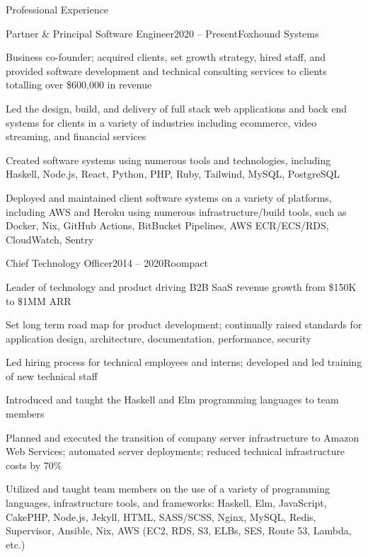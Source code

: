 \documentclass{resume} %
\begin{document}

\begin{rSection}{Professional Experience}

\begin{rSubsection}{Partner \& Principal Software Engineer}{2020 -- Present}{Foxhound Systems}{}
  \item Business co-founder; acquired clients, set growth strategy, hired staff, and provided software development and technical consulting services to clients totalling over \$600,000 in revenue
  \item Led the design, build, and delivery of full stack web applications and back end systems for clients in a variety of industries including ecommerce, video streaming, and financial services
  \item Created software systems using numerous tools and technologies, including Haskell, Node.js, React, Python, PHP, Ruby, Tailwind, MySQL, PostgreSQL
  \item Deployed and maintained client software systems on a variety of platforms, including AWS and Heroku using numerous infrastructure/build tools, such as Docker, Nix, GitHub Actions, BitBucket Pipelines, AWS ECR/ECS/RDS, CloudWatch, Sentry
\end{rSubsection}


\begin{rSubsection}{Chief Technology Officer}{2014 -- 2020}{Roompact}{}
  \item Leader of technology and product driving B2B SaaS revenue growth from \$150K to \$1MM ARR
  \item Set long term road map for product development; continually raised standards for application design, architecture, documentation, performance, security
  \item Led hiring process for technical employees and interns; developed and led training of new technical staff
  \item Introduced and taught the Haskell and Elm programming languages to team members
  \item Planned and executed the transition of company server infrastructure to Amazon Web Services; automated server deployments; reduced technical infrastructure costs by 70\%
  \item Utilized and taught team members on the use of a variety of programming languages, infrastructure tools, and frameworks: Haskell, Elm, JavaScript, CakePHP, Node.js, Jekyll, HTML, SASS/SCSS, Nginx, MySQL, Redis, Supervisor, Ansible, Nix, AWS (EC2, RDS, S3, ELBs, SES, Route 53, Lambda, etc.)
\end{rSubsection}


\end{rSection}
\end{document}
